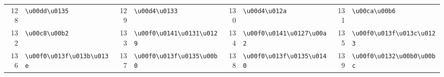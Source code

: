 \begin{table}[!htbp]
\begin{tabular}{r l r l r l r l}
128 & \texttt{\textbackslash{}u00dd\textbackslash{}u0135} & 129 & \texttt{\textbackslash{}u00d4\textbackslash{}u0133} & 130 & \texttt{\textbackslash{}u00d4\textbackslash{}u012a} & 131 & \texttt{\textbackslash{}u00ca\textbackslash{}u00b6} \\
132 & \texttt{\textbackslash{}u00c8\textbackslash{}u00b2} & 133 & \texttt{\textbackslash{}u00f0\textbackslash{}u0141\textbackslash{}u0131\textbackslash{}u0129} & 134 & \texttt{\textbackslash{}u00f0\textbackslash{}u0141\textbackslash{}u0127\textbackslash{}u00a2} & 135 & \texttt{\textbackslash{}u00f0\textbackslash{}u013f\textbackslash{}u013c\textbackslash{}u0123} \\
136 & \texttt{\textbackslash{}u00f0\textbackslash{}u013f\textbackslash{}u013b\textbackslash{}u013e} & 137 & \texttt{\textbackslash{}u00f0\textbackslash{}u013f\textbackslash{}u0135\textbackslash{}u00b0} & 138 & \texttt{\textbackslash{}u00f0\textbackslash{}u013f\textbackslash{}u0135\textbackslash{}u0140} & 139 & \texttt{\textbackslash{}u00f0\textbackslash{}u0132\textbackslash{}u00b0\textbackslash{}u00bc} \\

\end{tabular}
\end{table}
